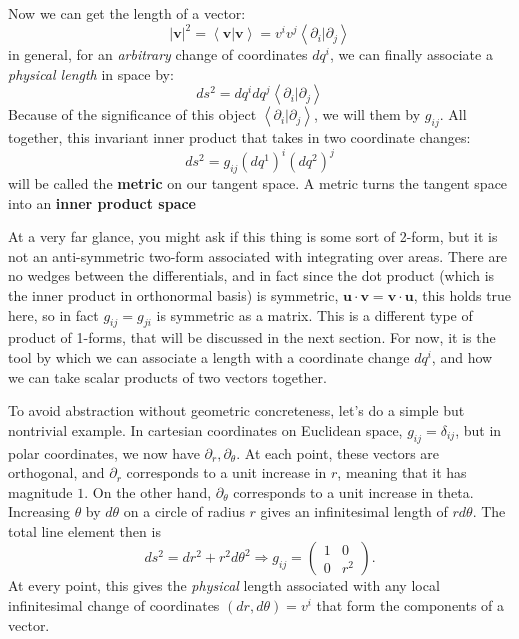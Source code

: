 	Now we can get the length of a vector:
	\begin{equation}
		|\mathbf v|^2 = \left< \mathbf v | \mathbf v \right> = v^i v^j \left< \partial_i | \partial_j \right> 
	\end{equation}
	in general, for an \emph{arbitrary} change of coordinates $dq^i$, we can finally associate a \emph{physical length} in space by:
	\begin{equation}
		ds^2 = dq^i dq^j  \left< \partial_i | \partial_j \right> 
	\end{equation}
	Because of the significance of this object $\left< \partial_i | \partial_j \right>$, we will them by $g_{ij}$. All together, this invariant inner product that takes in two coordinate changes:
	\begin{equation}
		ds^2 = g_{ij} {(dq^1)}^i {(dq^2)}^j 
	\end{equation}
	will be called the \textbf{metric} on our tangent space. A metric turns the tangent space into an \textbf{inner product space}
	
	At a very far glance, you might ask if this thing is some sort of 2-form, but it is not an anti-symmetric two-form associated with integrating over areas. There are no wedges between the differentials, and in fact since the dot product (which is the inner product in orthonormal basis) is symmetric, $\mathbf u \cdot \mathbf v = \mathbf v \cdot \mathbf u$, this holds true here, so in fact $g_{ij} = g_{ji}$ is symmetric as a matrix. This is a different type of product of 1-forms, that will be discussed in the next section. For now, it is the tool by which we can associate a length with a coordinate change $dq^i$, and how we can take scalar products of two vectors together. 
	
	To avoid abstraction without geometric concreteness, let's do a simple but nontrivial example. In cartesian coordinates on Euclidean space, $g_{ij} = \delta_{ij}$, but in polar coordinates, we now have $\partial_r, \partial_\theta$. At each point, these vectors are orthogonal, and $\partial_r$ corresponds to a unit increase in $r$, meaning that it has magnitude $1$. On the other hand, $\partial_\theta$ corresponds to a unit increase in theta. Increasing $\theta$ by $d\theta$ on a circle of radius $r$ gives an infinitesimal length of $r d\theta$. The total line element then is
	\begin{equation}
		ds^2 = dr^2 + r^2 d\theta^2 \Rightarrow g_{ij} = 
		\begin{pmatrix}
			1 & 0 \\
			0 & r^2 
		\end{pmatrix}.
	\end{equation}
	At every point, this gives the \emph{physical} length associated with any local infinitesimal change of coordinates $(dr, d\theta) = v^i$ that form the components of a vector.
	
